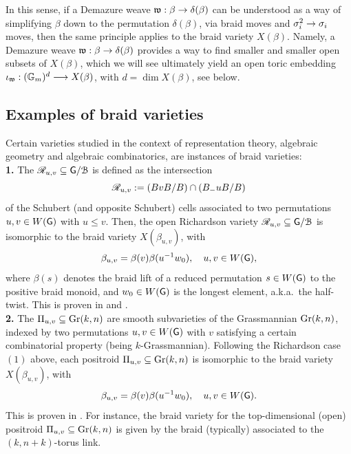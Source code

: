 \begin{remark}
In this sense, if a Demazure weave $\mathfrak{w}:\beta\to\delta(\beta)$ can be understood as a way of simplifying $\beta$ down to the permutation $\delta(\beta)$, via braid moves and $\sigma_i^2\to\sigma_i$ moves, then the same principle applies to the braid variety $X(\beta)$. Namely, a Demazure weave $\mathfrak{w}:\beta\to\delta(\beta)$ provides a way to find smaller and smaller open subsets of $X(\beta)$, which we will see ultimately yield an open toric embedding $\iota_{\mathfrak{w}}:(\mathbb{G}_m)^d\longrightarrow X(\beta)$, with $d={\dim X(\beta)}$, see  below.\sbs
\end{remark}


\subsection{Examples of braid varieties}\label{ssec:braid_varieties_examples} Certain varieties studied in the context of representation theory, algebraic geometry and algebraic combinatorics, are \color{blue}instances of braid varieties\color{black}:\\

{\bf 1.} The \color{blue}{\it open Richardson variety} \color{black} $\mathscr{R}_{u,v}\subseteq \mathsf{G}/\mathcal{B}$ is defined as the intersection
        $$\mathscr{R}_{u,v}:=(BvB/B)\cap (B_-uB/B)$$
        of the Schubert (and opposite Schubert) cells associated to two permutations $u,v\in W(\mathsf{G})$ with $u\leq v$. Then, the open Richardson variety $\mathscr{R}_{u,v}\subseteq \mathsf{G}/\mathcal{B}$ is isomorphic to the braid variety $X(\beta_{u,v})$, with
        $$\beta_{u,v}=\beta(v)\beta(u^{-1}w_0),\quad u,v\in W(\mathsf{G}),$$
        where $\beta(s)$ denotes the braid lift of a reduced permutation $s\in W(\mathsf{G})$ to the positive braid monoid, and $w_0\in W(\mathsf{G})$ is the longest element, a.k.a.~the half-twist. This is proven in \cite[Section 4]{CGGS2} and \cite[Section 3.6]{CGGLSS25}.\\

{\bf 2.} The \color{blue}{\it open positroid varieties} \color{black} $\Pi_{u,v}\subseteq\operatorname{Gr}(k,n)$ are smooth subvarieties of the Grassmannian $\operatorname{Gr}(k,n)$, indexed by two permutations $u,v\in W(\mathsf{G})$ with $v$ satisfying a certain combinatorial property (being $k$-Grassmannian). Following the Richardson case $(1)$ above, each positroid $\Pi_{u,v}\subseteq\operatorname{Gr}(k,n)$  is isomorphic to the braid variety $X(\beta_{u,v})$, with
        $$\beta_{u,v}=\beta(v)\beta(u^{-1}w_0),\quad u,v\in W(\mathsf{G}).$$
        This is proven in \cite[Theorem 1.3]{CGGS2}. For instance, the braid variety for the top-dimensional (open) positroid $\Pi_{u,v}\subseteq\operatorname{Gr}(k,n)$ is given by the braid (typically) associated to the $(k,n+k)$-torus link.\\
        
